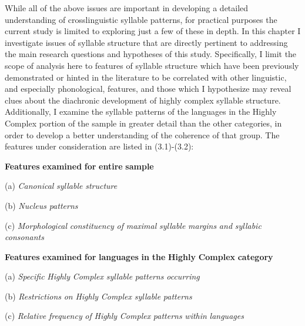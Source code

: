   While all of the above issues are important in developing a detailed understanding of crosslinguistic syllable patterns, for practical purposes the current study is limited to exploring just a few of these in depth. In this chapter I investigate issues of syllable structure that are directly pertinent to addressing the main research questions and hypotheses of this study. Specifically, I limit the scope of analysis here to features of syllable structure which have been previously demonstrated or hinted in the literature to be correlated with other linguistic, and especially phonological, features, and those which I hypothesize may reveal clues about the diachronic development of highly complex syllable structure. Additionally, I examine the syllable patterns of the languages in the Highly Complex portion of the sample in greater detail than the other categories, in order to develop a better understanding of the coherence of that group. The features under consideration are listed in (3.1)-(3.2):



\ea\label{ex:(3.1)}
   \textbf{Features} \textbf{examined} \textbf{for} \textbf{entire} \textbf{sample}



(a)   \textit{Canonical} \textit{syllable} \textit{structure}



(b)   \textit{Nucleus} \textit{patterns}



(c)   \textit{Morphological} \textit{constituency} \textit{of} \textit{maximal} \textit{syllable} \textit{margins} \textit{and} \textit{syllabic} \textit{consonants}
\z



\ea\label{ex:(3.2)}
   \textbf{Features} \textbf{examined} \textbf{for} \textbf{languages} \textbf{in} \textbf{the} \textbf{Highly} \textbf{Complex} \textbf{category}



(a)   \textit{Specific} \textit{Highly} \textit{Complex} \textit{syllable} \textit{patterns} \textit{occurring}



(b)   \textit{Restrictions} \textit{on} \textit{Highly} \textit{Complex} \textit{syllable} \textit{patterns}



(c)   \textit{Relative} \textit{frequency} \textit{of} \textit{Highly} \textit{Complex} \textit{patterns} \textit{within} \textit{languages}



